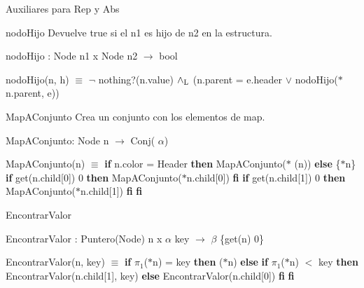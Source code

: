 \-Auxiliares para \-Rep y \-Abs

\begin{DoxyParagraph}{nodo\-Hijo}
\-Devuelve true si el n1 es hijo de n2 en la estructura.
\end{DoxyParagraph}
nodo\-Hijo \-: \-Node n1 x \-Node n2 $\to$ bool\par
 nodo\-Hijo(n, h) $\equiv$ $\lnot$ nothing?(n.\-value) $\land_{\rm L}$ (n.\-parent = e.\-header $\lor$ nodo\-Hijo($\ast$n.parent, e)) 

\begin{DoxyParagraph}{\-Map\-A\-Conjunto}
\-Crea un conjunto con los elementos de map.\par

\end{DoxyParagraph}
\-Map\-A\-Conjunto\-: \-Node n $\to$ \-Conj( $\alpha$)\par
 \-Map\-A\-Conjunto(n) $\equiv$ {\bfseries if} n.\-color = \-Header {\bfseries then} \-Map\-A\-Conjunto($\ast$ (n)) {\bfseries else} \{$\ast$n\}  {\bfseries if} get(n.\-child\mbox{[}0\mbox{]})  0 {\bfseries then} \-Map\-A\-Conjunto($\ast$n.child\mbox{[}0\mbox{]}) {\bfseries fi}  {\bfseries if} get(n.\-child\mbox{[}1\mbox{]})  0 {\bfseries then} \-Map\-A\-Conjunto($\ast$n.child\mbox{[}1\mbox{]}) {\bfseries fi} {\bfseries fi} 

\begin{DoxyParagraph}{\-Encontrar\-Valor}

\end{DoxyParagraph}
\-Encontrar\-Valor \-: \-Puntero(\-Node) n x $\alpha$ key $\to$ $\beta$ \{get(n)  0\}\par
 \-Encontrar\-Valor(n, key) $\equiv$ {\bfseries if} $\pi_1$($\ast$n) = key {\bfseries then} ($\ast$n) {\bfseries else} {\bfseries if} $\pi_1$($\ast$n) $<$ key {\bfseries then} \-Encontrar\-Valor(n.\-child\mbox{[}1\mbox{]}, key) {\bfseries else} \-Encontrar\-Valor(n.\-child\mbox{[}0\mbox{]}) {\bfseries fi} {\bfseries fi} 

